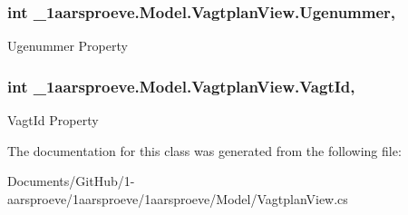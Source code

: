\subsubsection[{Ugenummer}]{\setlength{\rightskip}{0pt plus 5cm}int \+\_\+1aarsproeve.\+Model.\+Vagtplan\+View.\+Ugenummer\hspace{0.3cm}{\ttfamily [get]}, {\ttfamily [set]}}\label{class__1aarsproeve_1_1_model_1_1_vagtplan_view_a9d1c876dc939eafea04ad170a049df8b}


Ugenummer Property 

\hypertarget{class__1aarsproeve_1_1_model_1_1_vagtplan_view_a2255fed674c028434296baa136be598e}{}
\subsubsection[{Vagt\+Id}]{\setlength{\rightskip}{0pt plus 5cm}int \+\_\+1aarsproeve.\+Model.\+Vagtplan\+View.\+Vagt\+Id\hspace{0.3cm}{\ttfamily [get]}, {\ttfamily [set]}}\label{class__1aarsproeve_1_1_model_1_1_vagtplan_view_a2255fed674c028434296baa136be598e}


Vagt\+Id Property 



The documentation for this class was generated from the following file\+:\begin{DoxyCompactItemize}
\item 
Documents/\+Git\+Hub/1-\/aarsproeve/1aarsproeve/1aarsproeve/\+Model/Vagtplan\+View.\+cs\end{DoxyCompactItemize}
